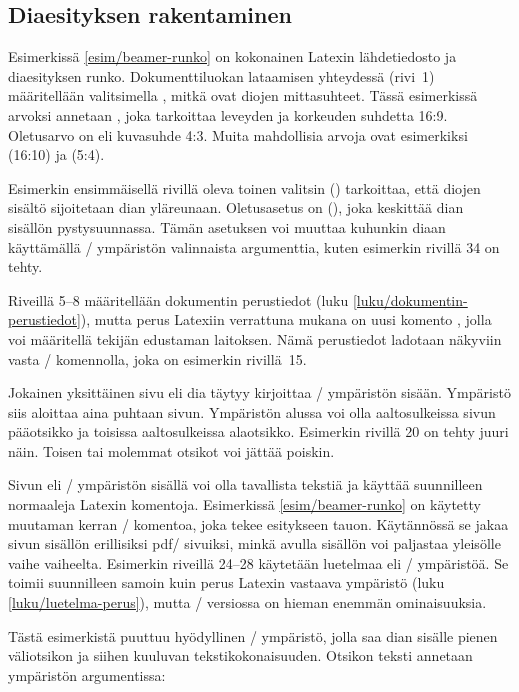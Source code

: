 \subsection{Diaesityksen rakentaminen}

Esimerkissä \ref{esim/beamer-runko} on kokonainen Latexin lähdetiedosto
ja diaesityksen runko. Dokumenttiluokan  lataamisen
yhteydessä (rivi~1) määritellään valitsimella , mitkä
ovat diojen mittasuhteet. Tässä esimerkissä arvoksi annetaan
, joka tarkoittaa leveyden ja korkeuden suhdetta 16:9.
Oletusarvo on  eli kuvasuhde 4:3. Muita mahdollisia arvoja
ovat esimerkiksi  (16:10) ja  (5:4).

Esimerkin ensimmäisellä rivillä oleva toinen valitsin 
() tarkoittaa, että diojen sisältö sijoitetaan dian
yläreunaan. Oletusasetus on  (), joka
keskittää dian sisällön pystysuunnassa. Tämän asetuksen voi muuttaa
kuhunkin diaan käyttämällä \-/ ympäristön valinnaista
argumenttia, kuten esimerkin rivillä 34 on tehty.

Riveillä 5--8 määritellään dokumentin perustiedot (luku
\ref{luku/dokumentin-perustiedot}), mutta perus Latexiin verrattuna
mukana on uusi komento , jolla voi määritellä tekijän
edustaman laitoksen. Nämä perustiedot ladotaan näkyviin vasta
\-/ komennolla, joka on esimerkin rivillä~15.

Jokainen yksittäinen sivu eli dia täytyy kirjoittaa \-/
ympäristön sisään. Ympäristö siis aloittaa aina puhtaan sivun.
Ympäristön alussa voi olla aaltosulkeissa sivun pääotsikko ja toisissa
aaltosulkeissa alaotsikko. Esimerkin rivillä 20 on tehty juuri näin.
Toisen tai molemmat otsikot voi jättää poiskin.

Sivun eli \-/ ympäristön sisällä voi olla tavallista
tekstiä ja käyttää suunnilleen normaaleja Latexin komentoja. Esimerkissä
\ref{esim/beamer-runko} on käytetty muutaman kerran \-/
komentoa, joka tekee esitykseen tauon. Käytännössä se jakaa sivun
sisällön erillisiksi pdf\-/ sivuiksi, minkä avulla sisällön voi
paljastaa yleisölle vaihe vaiheelta. Esimerkin riveillä 24--28 käytetään
luetelmaa eli \-/ ympäristöä. Se toimii suunnilleen
samoin kuin perus Latexin vastaava ympäristö (luku
\ref{luku/luetelma-perus}), mutta \-/ versiossa on hieman
enemmän ominaisuuksia.

Tästä esimerkistä puuttuu hyödyllinen \-/ ympäristö,
jolla saa dian sisälle pienen väliotsikon ja siihen kuuluvan
tekstikokonaisuuden. Otsikon teksti annetaan ympäristön argumentissa:

